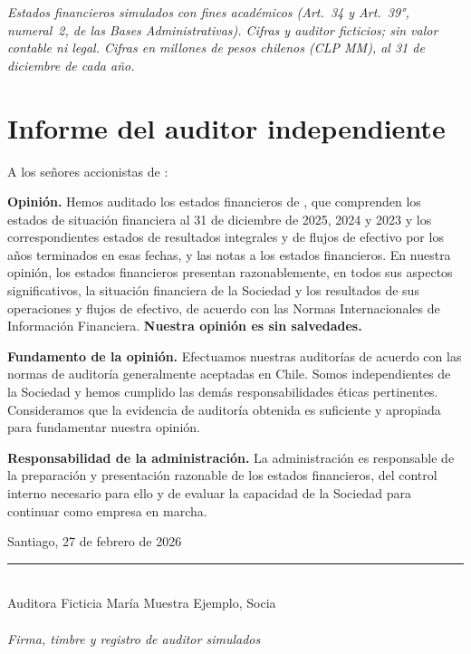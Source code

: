 \documentclass[carta,final]{lafrox}
\let\SIMoldsection\section
\renewcommand{\section}{\needspace{18\baselineskip}\SIMoldsection}
\begin{document}

\noindent\small\textit{Estados financieros simulados con fines académicos (Art.~34 y Art.~39°, numeral~2, de las Bases Administrativas). Cifras y auditor ficticios; sin valor contable ni legal. Cifras en millones de pesos chilenos (CLP MM), al 31 de diciembre de cada año.}\normalsize

\section*{Informe del auditor independiente}
\noindent A los señores accionistas de \LFXempresa:

\noindent \textbf{Opinión.} Hemos auditado los estados financieros de \LFXempresa, que comprenden los estados de situación financiera al 31 de diciembre de 2025, 2024 y 2023 y los correspondientes estados de resultados integrales y de flujos de efectivo por los años terminados en esas fechas, y las notas a los estados financieros. En nuestra opinión, los estados financieros presentan razonablemente, en todos sus aspectos significativos, la situación financiera de la Sociedad y los resultados de sus operaciones y flujos de efectivo, de acuerdo con las Normas Internacionales de Información Financiera. \textbf{Nuestra opinión es sin salvedades.}

\noindent \textbf{Fundamento de la opinión.} Efectuamos nuestras auditorías de acuerdo con las normas de auditoría generalmente aceptadas en Chile. Somos independientes de la Sociedad y hemos cumplido las demás responsabilidades éticas pertinentes. Consideramos que la evidencia de auditoría obtenida es suficiente y apropiada para fundamentar nuestra opinión.

\noindent \textbf{Responsabilidad de la administración.} La administración es responsable de la preparación y presentación razonable de los estados financieros, del control interno necesario para ello y de evaluar la capacidad de la Sociedad para continuar como empresa en marcha.

\vspace{6pt}
\noindent Santiago, 27 de febrero de 2026

\vspace{24pt}
\begin{center}
  \rule{6.4cm}{0.5pt}\\[2pt]
  Auditora Ficticia María Muestra Ejemplo, Socia\\
  \SIMauditora\\
  {\small\textit{Firma, timbre y registro de auditor simulados}}
\end{center}
\end{document}
